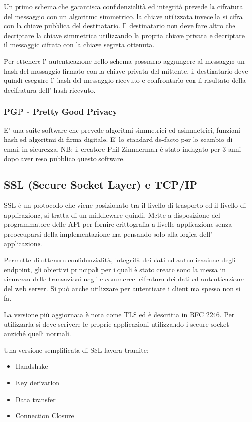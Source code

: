 Un primo schema che garantisca confidenzialità ed integrità prevede la cifratura del messaggio con un algoritmo simmetrico, la chiave utilizzata invece la si cifra con la chiave pubblica del destinatario.
Il destinatario non deve fare altro che decriptare la chiave simmetrica utilizzando la propria chiave privata e decriptare il messaggio cifrato con la chiave segreta ottenuta.

Per ottenere l' autenticazione nello schema possiamo aggiungere al messaggio un hash del messaggio firmato con la chiave privata del mittente, il destinatario deve quindi eseguire l' hash del messaggio ricevuto e confrontarlo con il risultato della decifratura dell' hash ricevuto.

\subsubsection{PGP - Pretty Good Privacy}
E' una suite software che prevede algoritmi simmetrici ed asimmetrici, funzioni hash ed algoritmi di firma digitale.
E' lo standard de-facto per lo scambio di email in sicurezza.
NB: il creatore Phil Zimmerman è stato indagato per 3 anni dopo aver reso pubblico questo software.

\subsection{SSL (Secure Socket Layer) e TCP/IP}
SSL è un protocollo che viene posizionato tra il livello di trasporto ed il livello di applicazione, si tratta di un middleware quindi.
Mette a disposizione del programmatore delle API per fornire crittografia a livello applicazione senza preoccuparsi della implementazione ma pensando solo alla logica dell' applicazione.

Permette di ottenere confidenzialità, integrità dei dati ed autenticazione degli endpoint, gli obiettivi principali per i quali è stato creato sono la messa in sicurezza delle transazioni negli e-commerce, cifratura dei dati ed autenticazione del web server.
Si può anche utilizzare per autenticare i client ma spesso non si fa.

La versione più aggiornata è nota come TLS ed è descritta in RFC 2246.
Per utilizzarla si deve scrivere le proprie applicazioni utilizzando i secure socket anziché quelli normali.

Una versione semplificata di SSL lavora tramite:
\begin{itemize}
    \item Handshake
    \item Key derivation
    \item Data transfer
    \item Connection Closure
\end{itemize}


